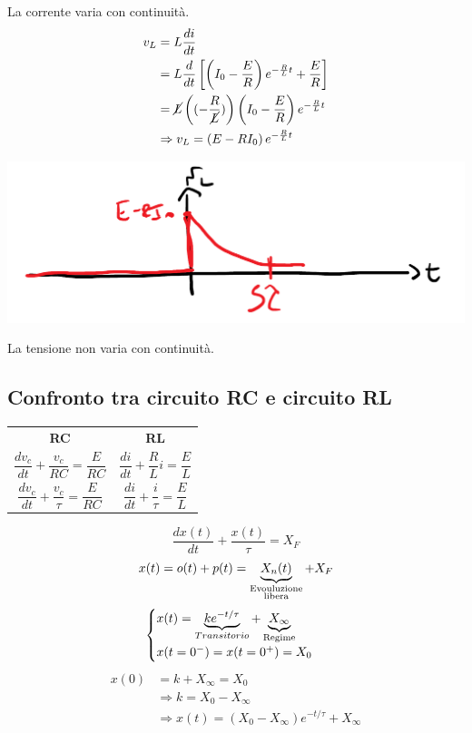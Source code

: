 \documentclass{article}
\begin{document}
La corrente varia con continuità.
\begin{align*}
    v_L&=L\frac{di}{dt}\\
    &=L\frac{d}{dt} \left[\left(I_0-\frac{E}{R}\right)e^{-\frac{R}{L}t}+\frac{E}{R}\right]\\
    &=\cancel{L} \left((-\frac{R}{\cancel{L}})\right)\left(I_0-\frac{E}{R}\right)e^{-\frac{R}{L}t}\\
    &\Rightarrow v_L=\left(E-RI_0\right)e^{-\frac{R}{L}t}
\end{align*}
\begin{center}
    \includegraphics[scale=0.3]{Image/RL_4.png}
\end{center}
La tensione non varia con continuità.


\subsection{Confronto tra circuito RC e circuito RL}
\begin{center}
    \begin{tabular}{c c}
        \textbf{RC} & \textbf{RL}\\
        $ \dfrac{dv_c}{dt} + \dfrac{v_c}{RC} = \dfrac{E}{RC} $ & $ \dfrac{di}{dt} + \dfrac{R}{L}i = \dfrac{E}{L} $\\
        $ \dfrac{dv_c}{dt} + \dfrac{v_c}{\tau} = \dfrac{E}{RC} $ & $ \dfrac{di}{dt} + \dfrac{i}{\tau} = \dfrac{E}{L} $\\
    \end{tabular}
\end{center}
\[
    \frac{dx(t)}{dt} + \frac{x(t)}{\tau} = X_F
\]
\[
    x(t) = o(t) + p(t) = \underbrace{X_n(t)}_{\substack{\text{Evouluzione} \\ \text{libera}}} + X_F    
\]
\[
    \begin{cases}
        x(t) = \underbrace{k e^{-t/\tau}}_{Transitorio} + \underbrace{X_{\infty}}_{\text{Regime}}\\
        x(t=0^-) = x(t=0^+) = X_0
    \end{cases}
\]
\begin{align*}
    x(0) &= k+X_{\infty} = X_0 \\
    &\Rightarrow k = X_0 - X_{\infty}\\
    &\Rightarrow x(t) = \left(X_0 - X_{\infty}\right)e^{-t/\tau} + X_{\infty}
\end{align*}
\end{document}
